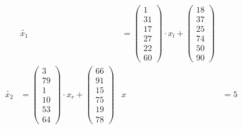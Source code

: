 \begin{align*}
&
\widetilde{x_1} & =
\begin{pmatrix}1\\31\\17\\27\\22\\60\end{pmatrix}
\cdot x_l +
\begin{pmatrix}18\\37\\25\\74\\50\\90\end{pmatrix}\\
%
\widetilde{x_2} & =
\begin{pmatrix}3\\79\\1\\10\\53\\64\end{pmatrix}
\cdot x_r +
\begin{pmatrix}66\\91\\15\\75\\19\\78\end{pmatrix}
&
x & = 5
\end{align*}

